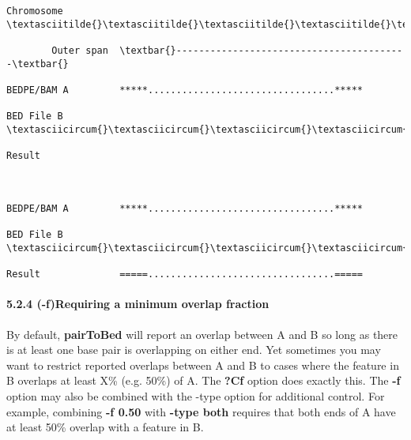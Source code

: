 \documentclass[letterpaper,10pt,english]{sphinxmanual}
\begin{document}
\begin{Verbatim}[commandchars=\\\{\}]
Chromosome  \textasciitilde{}\textasciitilde{}\textasciitilde{}\textasciitilde{}\textasciitilde{}\textasciitilde{}\textasciitilde{}\textasciitilde{}\textasciitilde{}\textasciitilde{}\textasciitilde{}\textasciitilde{}\textasciitilde{}\textasciitilde{}\textasciitilde{}\textasciitilde{}\textasciitilde{}\textasciitilde{}\textasciitilde{}\textasciitilde{}\textasciitilde{}\textasciitilde{}\textasciitilde{}\textasciitilde{}\textasciitilde{}\textasciitilde{}\textasciitilde{}\textasciitilde{}\textasciitilde{}\textasciitilde{}\textasciitilde{}\textasciitilde{}\textasciitilde{}\textasciitilde{}\textasciitilde{}\textasciitilde{}\textasciitilde{}\textasciitilde{}\textasciitilde{}\textasciitilde{}\textasciitilde{}\textasciitilde{}\textasciitilde{}\textasciitilde{}\textasciitilde{}\textasciitilde{}\textasciitilde{}\textasciitilde{}\textasciitilde{}\textasciitilde{}\textasciitilde{}\textasciitilde{}\textasciitilde{}\textasciitilde{}\textasciitilde{}\textasciitilde{}\textasciitilde{}\textasciitilde{}\textasciitilde{}\textasciitilde{}\textasciitilde{}\textasciitilde{}\textasciitilde{}\textasciitilde{}

        Outer span  \textbar{}-----------------------------------------\textbar{}

BEDPE/BAM A         *****.................................*****

BED File B             \textasciicircum{}\textasciicircum{}\textasciicircum{}\textasciicircum{}\textasciicircum{}\textasciicircum{}\textasciicircum{}\textasciicircum{}\textasciicircum{}\textasciicircum{}\textasciicircum{}\textasciicircum{}

Result



BEDPE/BAM A         *****.................................*****

BED File B     \textasciicircum{}\textasciicircum{}\textasciicircum{}\textasciicircum{}

Result              =====.................................=====
\end{Verbatim}


\paragraph{5.2.4 (-f)Requiring a minimum overlap fraction}
\label{content/pairToBed:f-requiring-a-minimum-overlap-fraction}
By default, \textbf{pairToBed} will report an overlap between A and B so long as there is at least one base
pair is overlapping on either end. Yet sometimes you may want to restrict reported overlaps between A
and B to cases where the feature in B overlaps at least X\% (e.g. 50\%) of A. The \textbf{?Cf} option does exactly
this. The \textbf{-f} option may also be combined with the -type option for additional control. For example,
combining \textbf{-f 0.50} with \textbf{-type both} requires that both ends of A have at least 50\% overlap with a
feature in B.
\end{document}
